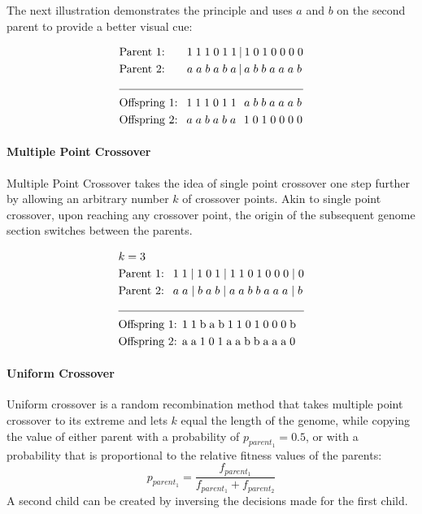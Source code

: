 \documentclass[11pt,a4paper,twoside,openright]{scrbook}
\begin{document}
The next illustration demonstrates the principle and uses \(a\) and \(b\) on the second parent to provide a better visual cue:


\begin{equation*}
  \begin{aligned}
    & \text{Parent 1: } \ \ \ \ \,1\;1\;1\;0\;1\;1\hspace{0.2em}|\hspace{0.2em}1\;0\;1\;0\;0\;0\;0 \\
    & \text{Parent 2: } \ \ \ \ \,a\;a\;b\;a\;b\;a\hspace{0.2em}|\hspace{0.2em}a\;b\;b\;a\;a\;a\;b \\
    \cline{1-2}
    & \text{Offspring 1: } \ 1\;1\;1\;0\;1\;1\;\hspace{0.40em}a\;b\;b\;a\;a\;a\;b \\
    & \text{Offspring 2: } \ a\;a\;b\;a\;b\;a\;\hspace{0.40em}1\;0\;1\;0\;0\;0\;0
  \end{aligned}
\end{equation*}

\paragraph{Multiple Point Crossover}
Multiple Point Crossover takes the idea of single point crossover one step further by allowing an arbitrary number \(k\) of crossover points. Akin to single point crossover, upon reaching any crossover point, the origin of the subsequent genome section switches between the parents.

\begin{equation*}
  \begin{aligned}
    & k = 3 \\
    & \text{Parent 1: } \ 1\;1\;|\;1\;0\;1\;|\;1\;1\;0\;1\;0\;0\;0\;|\;0 \\
    & \text{Parent 2: } \ a\;a\;|\;b\;a\;b\;|\;a\;a\;b\;b\;a\;a\;a\;|\;b \\
    \cline{1-2}
    & \text{Offspring 1: 1\;1\;b\;a\;b\;1\;1\;0\;1\;0\;0\;0\;b} \\
    & \text{Offspring 2: a\;a\;1\;0\;1\;a\;a\;b\;b\;a\;a\;a\;0}
  \end{aligned}
\end{equation*}

\paragraph{Uniform Crossover}
Uniform crossover \cite{Eiben94} is a random recombination method that takes multiple point crossover to its extreme and lets \(k\) equal the length of the genome, while copying the value of either parent with a probability of \(p_{parent_1} = 0.5\), or with a probability that is proportional to the relative fitness values of the parents:
\begin{equation}
p_{parent_1} = \frac{f_{parent_1}}{f_{parent_1} + f_{parent_2}}
\end{equation}
A second child can be created by inversing the decisions made for the first child.
\end{document}
